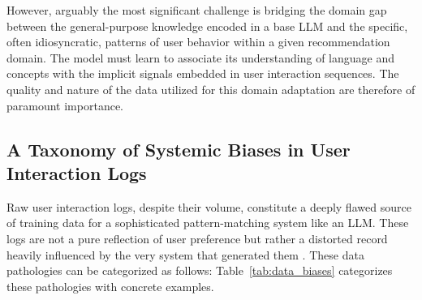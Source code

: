 \documentclass[]{fairmeta}
\begin{document}
However, arguably the most significant challenge is bridging the domain gap between the general-purpose knowledge encoded in a base LLM and the specific, often idiosyncratic, patterns of user behavior within a given recommendation domain. The model must learn to associate its understanding of language and concepts with the implicit signals embedded in user interaction sequences. The quality and nature of the data utilized for this domain adaptation are therefore of paramount importance.
\subsection{A Taxonomy of Systemic Biases in User Interaction Logs}
Raw user interaction logs, despite their volume, constitute a deeply flawed source of training data for a sophisticated pattern-matching system like an LLM. These logs are not a pure reflection of user preference but rather a distorted record heavily influenced by the very system that generated them \cite{chen2021biasdebiasrecommendersystem, NEURIPS2023_eb3c42dd, li2023fairerfairnessdecisionrationale, das2024unveilingmitigatingbiaslarge}. These data pathologies can be categorized as follows:
Table~\ref{tab:data_biases} categorizes these pathologies with concrete examples.
\end{document}
